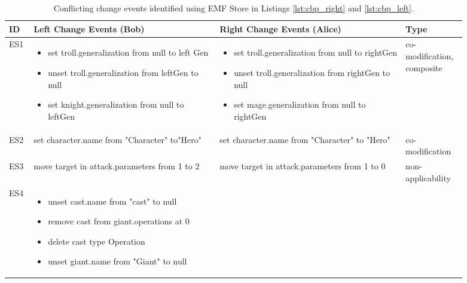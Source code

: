 \begin{table}[ht]
\centering
\caption{Conflicting change events identified using EMF Store in Listings \ref{lst:cbp_right} and \ref{lst:cbp_left}.}
\label{table:conflicts_emfs}
\begin{tabular}{|p{0.04\linewidth}|p{0.37\linewidth}|p{0.37\linewidth}|
		p{0.11\linewidth}|}
	\hline
	\textbf{ID} & 
	\textbf{Left Change Events (Bob)} & 
	\textbf{Right Change Events (Alice)} & 
	\textbf{Type}\\ 
	\hline
	ES1 & 
	\begin{minipage}[t]{\linewidth}
		\raggedright
		\begin{itemize}[leftmargin=0pt]
			\setlength
			\item[] set troll.generalization from null to left
			Gen
			\item[] unset troll.generalization from leftGen
			to null
			\item[] set knight.generalization from null
			to leftGen
		\end{itemize}
	\end{minipage} & 
	\begin{minipage}[t]{\linewidth}
		\raggedright
		\begin{itemize}[leftmargin=0pt]
			\setlength
			\item[] set troll.generalization from null to
			rightGen
			\item[] unset troll.generalization from rightGen
			to null
			\item[] set mage.generalization from null to
			rightGen
		\end{itemize}
	\end{minipage} & 
	co-modification,
	composite \\
	\hline
	ES2 & set character.name from "Character"
	to"Hero" & 
	set character.name from "Character"
	to "Hero" & 
	co-modification \\ 
	\hline
	ES3 & 
	move target in attack.parameters from
	1 to 2
	& 
	move target in attack.parameters from
	1 to 0
	& 
	non-applicability\\
	\hline
	ES4 & 
	\begin{minipage}[t]{\linewidth}
		\raggedright
		\begin{itemize}[leftmargin=0pt]
			\setlength
			\item[] unset cast.name from "cast" to null
			\item[] remove cast from giant.operations at 0
			\item[] delete cast type Operation
			\item[] unset giant.name from "Giant" to null

\end{itemize}
\end{minipage}
\end{tabular}
\end{table}

